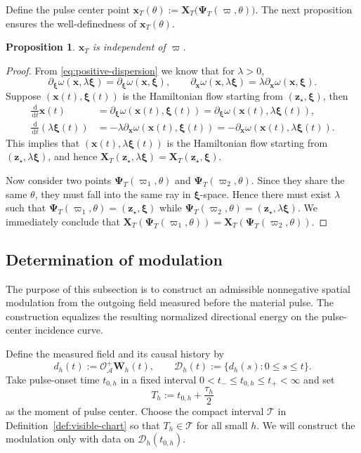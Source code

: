 \documentclass[11pt,reqno]{amsart}
\newtheorem{proposition}{Proposition}[section]
\newcommand{\dd}{\,\mathrm{d}}
\numberwithin{equation}{section}
\begin{document}
Define the pulse center point $\bm{x}_T(\theta):=\bm X_T\bigl(\bm\Psi_T(\varpi,\theta)\bigr)$. The next proposition ensures the well-definedness of $\bm{x}_T(\theta)$.
\begin{proposition}
$\bm{x}_T$ is independent of $\varpi$.
\end{proposition}
\begin{proof}
    From \eqref{eq:positive-dispersion} we know that for $\lambda>0$, 
    $$
        \partial_{\bm{\xi}}\omega(\bm{x},\lambda\bm{\xi}) = \partial_{\bm{\xi}}\omega(\bm{x},\bm{\xi}),\qquad \partial_{\bm{x}}\omega(\bm{x},\lambda\bm{\xi}) = \lambda\partial_{\bm{x}}\omega(\bm{x},\bm{\xi}).
    $$
    Suppose $(\bm{x}(t),\bm{\xi}(t))$ is the Hamiltonian flow starting from $(\bm{z}_\star,\bm{\xi})$, then 
    \begin{align*}
        \frac{\dd}{\dd t}\bm{x}(t) &= \partial_{\bm{\xi}}\omega(\bm{x}(t),\bm{\xi}(t)) = \partial_{\bm{\xi}}\omega(\bm{x}(t),\lambda\bm{\xi}(t)), \\
        \frac{\dd}{\dd t}(\lambda\bm{\xi}(t)) &= -\lambda\partial_{\bm{x}}\omega(\bm{x}(t),\bm{\xi}(t)) = -\partial_{\bm{x}}\omega(\bm{x}(t),\lambda\bm{\xi}(t)).
    \end{align*}
    This implies that $(\bm{x}(t),\lambda\bm{\xi}(t))$ is the Hamiltonian flow starting from $(\bm{z}_\star,\lambda\bm{\xi})$, and hence $\bm X_T(\bm{z}_\star,\lambda\bm{\xi}) = \bm X_T(\bm{z}_\star,\bm{\xi})$.
    
    Now consider two points $\bm\Psi_T(\varpi_1,\theta)$ and $\bm\Psi_T(\varpi_2,\theta)$. Since they share the same $\theta$, they must fall into the same ray in $\bm{\xi}$-space. Hence there must exist $\lambda$ such that $\bm\Psi_T(\varpi_1,\theta) = (\bm{z}_\star,\bm{\xi})$ while $\bm\Psi_T(\varpi_2,\theta)=(\bm{z}_\star,\lambda\bm{\xi})$. We immediately conclude that $\bm X_T(\bm\Psi_T(\varpi_1,\theta)) = \bm X_T(\bm\Psi_T(\varpi_2,\theta))$.
\end{proof}

\subsection{Determination of modulation}

The purpose of this subsection is to construct an admissible nonnegative spatial modulation from the outgoing field measured before the material pulse. The construction equalizes the resulting normalized directional energy on the pulse-center incidence curve.

Define the measured field and its causal history by
\begin{equation*}
    d_h(t):=\mathcal O_{\mathcal A}^+\bm{W}_h(t), \qquad \mathcal D_h(t):=\{d_h(s):0\le s\le t\}.
\end{equation*}
Take pulse-onset time $t_{0,h}$ in a fixed interval $0<t_-\le t_{0,h}\le t_+<\infty$ and set
\begin{equation*}
    T_h:=t_{0,h}+\frac{\tau_h}{2}
\end{equation*}
as the moment of pulse center. Choose the compact interval $\mathcal T$ in Definition~\ref{def:visible-chart} so that $T_h\in\mathcal T$ for all small $h$. We will construct the modulation only with data on $\mathcal D_h(t_{0,h})$.
\end{document}
